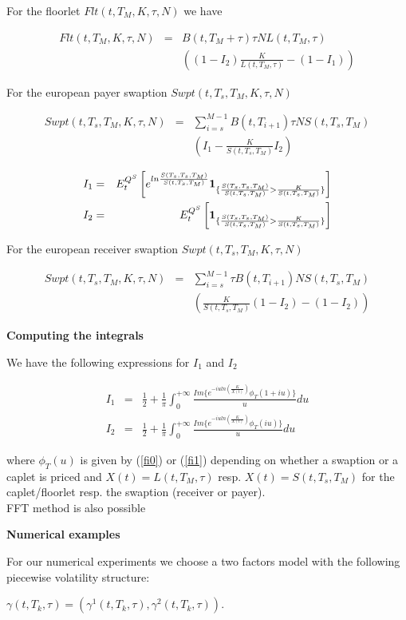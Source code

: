 \documentclass[10pt,a4paper,english,landscape]{slides}
\newcommand{\ban}{\begin{eqnarray*}}
\newcommand{\ean}{\end{eqnarray*}}
\begin{document}
For the floorlet $Flt(t,T_M,K,\tau,N)$ we have

\ban
Flt(t,T_M,K,\tau,N)&=&B(t,T_M+\tau)\tau N L(t,T_M,\tau)\\
& &\left( (1-I_2)\frac{K}{L(t,T_M,\tau)} -(1-I_1) \right)
\ean

For the european payer  swaption $Swpt(t,T_s,T_M,K,\tau,N)$ 

\ban
Swpt(t,T_s,T_M,K,\tau,N)&=& \sum_{i=s}^{M-1} B(t,T_{i+1}) \tau N S(t,T_s,T_M) \\
&&\left( I_1 - \frac{K}{S(t,T_s,T_M)}I_2 \right)
\ean

\ban
I_1&=&E^{Q^S}_t\left[ e^{ln\frac{S(T_s,T_s,T_M)}{S(t,T_s,T_M)}} {\bf 1}_{\lbrace \frac{S(T_s,T_s,T_M)}{S(t,T_s,T_M)}>\frac{K}{S(t,T_s,T_M)} \rbrace } \right]\\
I_2&=&E^{Q^S}_t\left[  {\bf 1}_{ \lbrace \frac{S(T_s,T_s,T_M)}{S(t,T_s,T_M)}>\frac{K}{S(t,T_s,T_M)} \rbrace }\right]
\ean

For the  european receiver swaption $Swpt(t,T_s,T_M,K,\tau,N)$ 

\ban
Swpt(t,T_s,T_M,K,\tau,N)&=& \sum_{i=s}^{M-1} \tau B(t,T_{i+1}) N S(t,T_s,T_M) \\
&&\left( \frac{K}{S(t,T_s,T_M)}(1-I_2) - (1-I_2) \right) 
\ean



{\bf Computing the integrals}


We have the following expressions for $I_1$ and $I_2$



\ban
I_1&=&\frac{1}{2}+\frac{1}{\pi}\int_0^{+\infty} \frac{ Im\lbrace e^{-iuln\left( \frac{K}{X(t)} \right)}   \phi_T(1+iu) \rbrace }{u}du\\
I_2&=&\frac{1}{2}+\frac{1}{\pi}\int_0^{+\infty} \frac{ Im\lbrace e^{-iuln\left( \frac{K}{X(t)} \right) }   \phi_T(iu) \rbrace }{u}du
\ean

where $\phi_T(u)$ is given by (\ref{fi0}) or (\ref{fi1}) depending on whether a swaption or a caplet is priced and $X(t)=L(t,T_M,\tau)$ resp. $X(t)=S(t,T_s,T_M)$ for the caplet/floorlet resp. the swaption (receiver or payer). 
\\
FFT method is also possible




{\bf Numerical examples} 

For our numerical experiments we choose a two factors model with the following piecewise volatility structure: 

$\gamma(t,T_k,\tau)=(\gamma^1(t,T_k,\tau),\gamma^2(t,T_k,\tau))$.  
\end{document}
